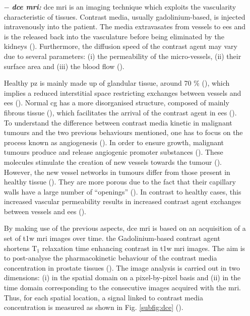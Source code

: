 \begin{enumerate}[leftmargin=*]
\item[$-$] \textbf{\textit{\ac{dce} \ac{mri}:}} \ac{dce} \ac{mri} is an imaging technique which exploits the vascularity characteristic of tissues. Contrast media, usually gadolinium-based, is injected intravenously into the patient. The media extravasates from vessels to \ac{ees} and is the released back into the vasculature before being eliminated by the kidneys (\cite{Gribbestad2005}). Furthermore, the diffusion speed of the contrast agent may vary due to several parameters: (i) the permeability of the micro-vessels, (ii) their surface area and (iii) the blood flow (\cite{Padhani2002}).

Healthy \ac{pz} is mainly made up of glandular tissue, around 70 \% (\cite{Choi2007}), which implies a reduced interstitial space restricting exchanges between vessels and \ac{ees} (\cite{Buckley2004,Niekerk2009}). Normal \ac{cg} has a more disorganised structure, composed of mainly fibrous tissue (\cite{Choi2007,Hoeks2011}), which facilitates the arrival of the contrast agent in \ac{ees} (\cite{Niekerk2013}). To understand the difference between contrast media kinetic in malignant tumours and the two previous behaviours mentioned, one has to focus on the process known as angiogenesis (\cite{Carmeliet2000}). In order to ensure growth, malignant tumours produce and release angiogenic promoter substances (\cite{Carmeliet2000}). These molecules stimulate the creation of new vessels towards the tumour (\cite{Carmeliet2000}). However, the new vessel networks in tumours differ from those present in healthy tissue (\cite{Gribbestad2005}). They are more porous due to the fact that their capillary walls have a large number of ``openings'' (\cite{Gribbestad2005,Choi2007}). In contrast to healthy cases, this increased vascular permeability results in increased contrast agent exchanges between vessels and \ac{ees} (\cite{Verma2012}).

By making use of the previous aspects, \ac{dce} \ac{mri} is based on an acquisition of a set of \ac{t1w} \ac{mri} images over time. the Gadolinium-based contrast agent shortens T$_1$ relaxation time enhancing contrast in \ac{t1w} \ac{mri} images. The aim is to post-analyse the pharmacokinetic behaviour of the contrast media concentration in prostate tissues (\cite{Verma2012}). The image analysis is carried out in two dimensions: (i) in the spatial domain on a pixel-by-pixel basis and (ii) in the time domain corresponding to the consecutive images acquired with the \ac{mri}. Thus, for each spatial location, a signal linked to contrast media concentration is measured as shown in Fig. \ref{subfig:dce} (\cite{Tofts2010}). 


\end{enumerate}
